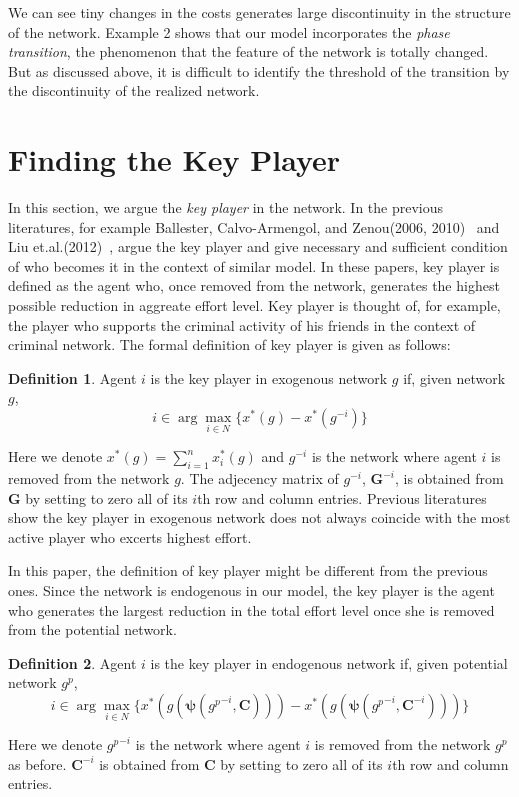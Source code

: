 \documentclass[12pt]{article}
\theoremstyle{definition}
\newtheorem{definition}{Definition}
\begin{document}
We can see tiny changes in the costs generates large discontinuity in the structure of the network.
Example 2 shows that our model incorporates the {\it{phase transition}}, the phenomenon that the feature of the network is totally changed.
But as discussed above, it is difficult to identify the threshold of the transition by the discontinuity of the realized network.


\section{Finding the Key Player}

In this section, we argue the {\it{key player}} in the network.
In the previous literatures, for example Ballester, Calvo-Armengol, and Zenou(2006, 2010)~\cite{whowho, delinquent} and Liu et.al.(2012)~\cite{criminal}, argue the key player and give necessary and sufficient condition of who becomes it in the context of similar model.
In these papers, key player is defined as the agent who, once removed from the network, generates the highest possible reduction in aggreate effort level.
Key player is thought of, for example, the player who supports the criminal activity of his friends in the context of criminal network.
The formal definition of key player is given as follows:

\begin{definition}
Agent $i$ is the key player in exogenous network $g$ if, given network $g$,
\[ i \in \arg \max_{i \in N} \{ x^*(g) - x^*(g^{-i}) \} \]
\end{definition}

Here we denote $x^*(g) = \sum_{i=1}^n x_i^*(g)$ and $g^{-i}$ is the network where agent $i$ is removed from the network $g$.
The adjecency matrix of $g^{-i}$, $\bm{G}^{-i}$, is obtained from $\bm{G}$ by setting to zero all of its $i$th row and column entries.
Previous literatures show the key player in exogenous network does not always coincide with the most active player who excerts highest effort.

In this paper, the definition of key player might be different from the previous ones.
Since the network is endogenous in our model, the key player is the agent who generates the largest reduction in the total effort level once she is removed from the potential network.

\begin{definition}
Agent $i$ is the key player in endogenous network if, given potential network $g^p$,
\[ i \in \arg \max_{i \in N} \{ x^*(g(\bm{\psi}({g^p}^{-i}, \bm{C}))) - x^*(g(\bm{\psi}({g^p}^{-i}, \bm{C}^{-i}))) \} \]
\end{definition}
Here we denote ${g^p}^{-i}$ is the network where agent $i$ is removed from the network $g^p$ as before.
$\bm{C}^{-i}$ is obtained from $\bm{C}$ by setting to zero all of its $i$th row and column entries.
\end{document}
